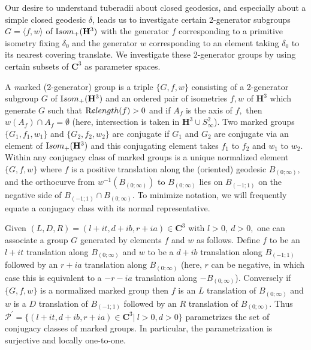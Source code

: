 \begin{definition}
Our desire to understand tuberadii about closed geodesics, and especially about a simple closed geodesic $\delta$, leads us to investigate certain 2-generator subgroups $G =
\langle f,w\rangle$  of ${\textrm Isom}_+({\mathbf H}^3)$ with the generator $f$ corresponding to a primitive isometry fixing $\delta_0$ and the generator
$w$ corresponding to an element taking $\delta_0$ to its nearest covering translate.  We investigate these 2-generator groups by using certain
subsets of ${\mathbf C}^3$ as parameter spaces.

A {\textit marked {\textrm (2-}generator\/{\textrm )} group} is a triple $\{G,f,w\}$ consisting of a 2-generator subgroup $G$ of ${\textrm Isom}_+({\mathbf H}^3)$
and an ordered pair of isometries $f,w$ of ${\mathbf H}^3$ which generate $G$  such that ${\textrm Relength}(f) > 0$ and if $A_f$ is the axis of $f,$ then $w(A_f)
\cap A_f  = \emptyset$  (here, intersection is taken in ${\mathbf H}^3 \cup S^2_\infty$). Two marked groups $\{G_1,f_1,w_1\}$ and $\{G_2,f_2,w_2\}$
are {\textit conjugate} if $G_1$ and $G_2$ are conjugate via an element of ${\textrm Isom}_+({\mathbf H}^3)$ and this conjugating element takes $f_1$ to $f_2$
and
$w_1$ to $w_2.$  Within any conjugacy class of marked groups is a unique normalized element
$\{G,f,w\}$ where $f$ is a
positive translation  along the (oriented) geodesic $B_{(0;\infty)},$  and the
orthocurve from $w^{-1}(B_{(0;\infty)})$ to $B_{(0;\infty)}$ lies on 
$ B_{(-1;1)}$
on the negative side of $ B_{(-1;1)}\cap B_{(0;\infty)}.$  
To minimize notation, we will frequently equate a conjugacy class with its normal representative.
\end{definition}

Given $(L,D,R)=(l+it, d+ib, r+ia)\in{\mathbf C}^3$ with $l > 0,\ d > 0,$ one  can associate a group $G$ generated by  elements $f$ and $w$ as follows.  Define $f$ to be an $l+it$ translation along $B_{(0;\infty)}$ and $w$ to be a $d+ib$ translation along $ B_{(-1;1)}$ followed by an $r+ia$ translation along $B_{(0;\infty)}$ (here, $r$ can be negative, in which case this is equivalent to
a
$-r-ia$ translation along $-B_{(0;\infty)}$).  Conversely if $\{G,f,w\}$ is a normalized marked group then $f$ is an $L$ translation of $B_{(0;\infty)}$
and $w$ is a $D$ translation of 
$ B_{(-1;1)}$ followed by an $R$ translation of $B_{(0;\infty)}.$ Thus
${\mathcal P}^\prime = \{(l+it,d+ib,r+ia)\in {\mathbf C}^3 | \ l>0, d>0\}$ 
parametrizes the
set of conjugacy classes of marked groups.  In particular, the parametrization is surjective and locally one-to-one.

